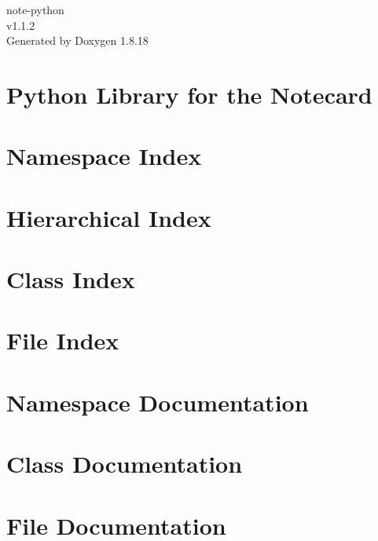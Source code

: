 \let\mypdfximage\pdfximage\def\pdfximage{\immediate\mypdfximage}\documentclass[twoside]{book}
\newcommand{\+}{\discretionary{\mbox{\scriptsize$\hookleftarrow$}}{}{}}
\newcommand{\clearemptydoublepage}{%
  \newpage{\pagestyle{empty}\cleardoublepage}%
}
\begin{document}
\hypersetup{pageanchor=false,
             bookmarksnumbered=true,
             pdfencoding=unicode
            }
\begin{titlepage}
\vspace*{7cm}
\begin{center}%
{\Large note-\/python \\[1ex]\large v1.\+1.\+2 }\\
\vspace*{1cm}
{\large Generated by Doxygen 1.8.18}\\
\end{center}
\end{titlepage}
\clearemptydoublepage
{}
\tableofcontents
\clearemptydoublepage
{}
\hypersetup{pageanchor=true}

\chapter{Python Library for the Notecard}
\label{index}\hypertarget{index}{}
\chapter{Namespace Index}

\chapter{Hierarchical Index}

\chapter{Class Index}

\chapter{File Index}

\chapter{Namespace Documentation}








\chapter{Class Documentation}



\chapter{File Documentation}









\backmatter
\newpage
{}
\clearemptydoublepage
{}
\printindex
\end{document}
